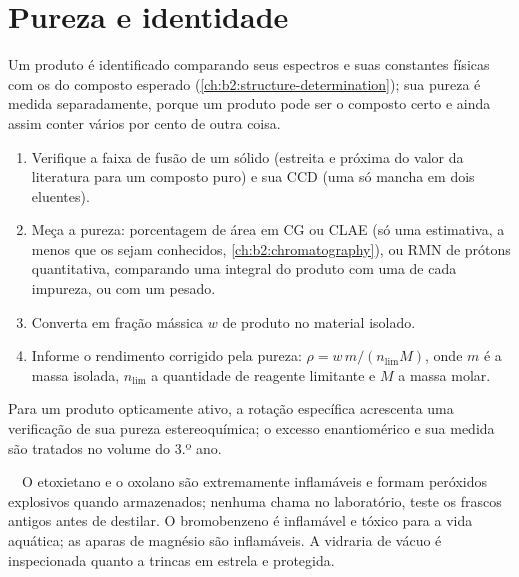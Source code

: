 \section{Pureza e identidade}

Um produto é identificado comparando seus espectros e suas constantes físicas com os do composto esperado
(\cref{ch:b2:structure-determination}); sua pureza é medida separadamente, porque um produto pode ser o
composto certo e ainda assim conter vários por cento de outra coisa.

\begin{method}\label{met:b2:lab-techniques-2:purity}
\begin{enumerate}
  \item Verifique a faixa de fusão de um sólido (estreita e próxima do valor da literatura para um
        composto puro) e sua CCD (uma só mancha em dois eluentes).
  \item Meça a pureza: porcentagem de área em CG ou CLAE (só uma estimativa, a menos que os  sejam conhecidos, \cref{ch:b2:chromatography}), ou RMN de prótons quantitativa,
        comparando uma integral do produto com uma de cada impureza, ou com um  pesado.
  \item Converta em fração mássica $w$ de produto no material isolado.
  \item Informe o rendimento corrigido pela pureza: $\rho = w\,m/(n_{\mathrm{lim}}M)$, onde $m$ é a
        massa isolada, $n_{\mathrm{lim}}$ a quantidade de reagente limitante e $M$ a massa molar.
\end{enumerate}
\end{method}

Para um produto opticamente ativo, a rotação específica acrescenta uma verificação de sua pureza
estereoquímica; o excesso enantiomérico e sua medida são tratados no volume do 3.º ano.

\begin{safety}{\,\,\,\,}
O etoxietano e o oxolano são extremamente inflamáveis e formam peróxidos explosivos quando armazenados;
nenhuma chama no laboratório, teste os frascos antigos antes de destilar. O bromobenzeno é inflamável e
tóxico para a vida aquática; as aparas de magnésio são inflamáveis. A vidraria de vácuo é inspecionada
quanto a trincas em estrela e protegida.
\end{safety}

